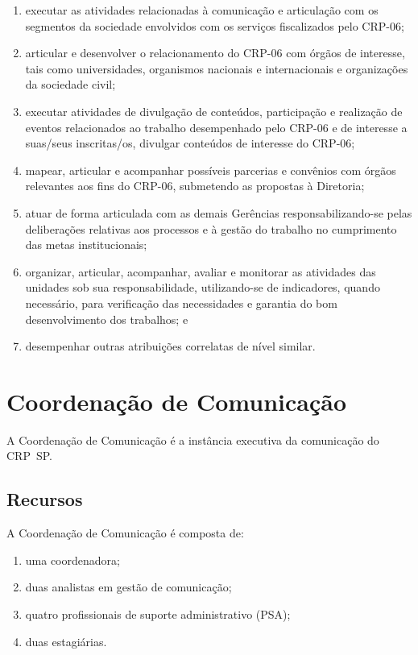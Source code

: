 \begin{enumerate}

  \item
        executar as atividades relacionadas à comunicação e articulação com os
        segmentos da sociedade envolvidos com os serviços fiscalizados pelo
        CRP-06;
  \item
        articular e desenvolver o relacionamento do CRP-06 com órgãos de
        interesse, tais como universidades, organismos nacionais e
        internacionais e organizações da sociedade civil;
  \item
        executar atividades de divulgação de conteúdos, participação e
        realização de eventos relacionados ao trabalho desempenhado pelo
        CRP-06 e de interesse a suas/seus inscritas/os, divulgar conteúdos de
        interesse do CRP-06;
  \item
        mapear, articular e acompanhar possíveis parcerias e convênios com
        órgãos relevantes aos fins do CRP-06, submetendo as propostas à
        Diretoria;
  \item
        atuar de forma articulada com as demais Gerências responsabilizando-se
        pelas deliberações relativas aos processos e à gestão do trabalho no
        cumprimento das metas institucionais;
  \item
        organizar, articular, acompanhar, avaliar e monitorar as atividades
        das unidades sob sua responsabilidade, utilizando-se de indicadores,
        quando necessário, para verificação das necessidades e garantia do bom
        desenvolvimento dos trabalhos; e
  \item
        desempenhar outras atribuições correlatas de nível similar.
\end{enumerate}

\section{Coordenação de
  Comunicação}

A Coordenação de Comunicação é a instância executiva da comunicação do
CRP~SP.

\subsection{Recursos}

A Coordenação de Comunicação é composta de:

\begin{enumerate}

  \item
        uma coordenadora;
  \item
        duas analistas em gestão de comunicação;
  \item
        quatro profissionais de suporte administrativo (PSA);
  \item
        duas estagiárias.
\end{enumerate}

